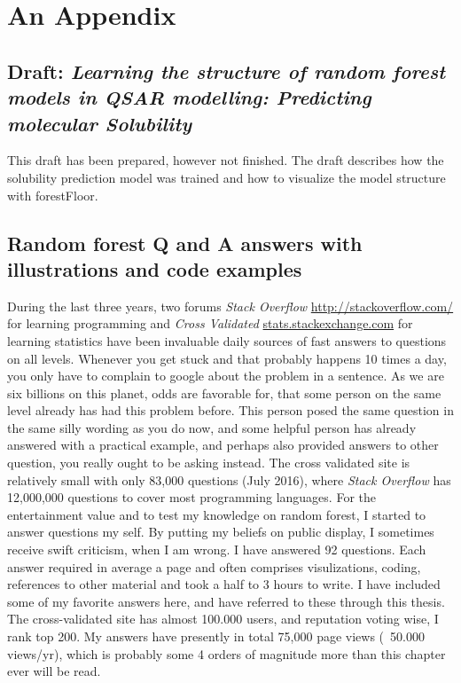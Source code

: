 \chapter{An Appendix}

\section{Draft: \textit{Learning the structure of random forest models in QSAR modelling: Predicting molecular Solubility}}
\label{article:solubility}

This draft has been prepared, however not finished. The draft describes how the solubility prediction model was trained and how to visualize the model structure with forestFloor.



\section{Random forest Q and A answers with illustrations and code examples}

During the last three years, two forums \textit{Stack Overflow} \url{http://stackoverflow.com/} for learning programming and \textit{Cross Validated} \url{stats.stackexchange.com} for learning statistics have been invaluable daily sources of fast answers to questions on all levels. Whenever you get stuck and that probably happens 10 times a day, you only have to complain to google about the problem in a sentence. As we are six billions on this planet, odds are favorable for, that some person on the same level already has had this problem before. This person posed the same question in the same silly wording as you do now, and some helpful person has already answered with a practical example, and perhaps also provided answers to other question, you really ought to be asking instead. The cross validated site is relatively small with only 83,000 questions (July 2016), where \textit{Stack Overflow} has 12,000,000 questions to cover most programming languages. For the entertainment value and to test my knowledge on random forest, I started to answer questions my self. By putting my beliefs on public display, I sometimes receive swift criticism, when I am wrong. I have answered 92 questions. Each answer required in average a page and often comprises visulizations, coding, references to other material and took a half to 3 hours to write. I have included some of my favorite answers here, and have referred to these through this thesis. The cross-validated site has almost 100.000 users, and reputation voting wise, I rank top 200. My answers have presently in total 75,000 page views (~50.000 views/yr), which is probably some 4 orders of magnitude more than this chapter ever will be read.


